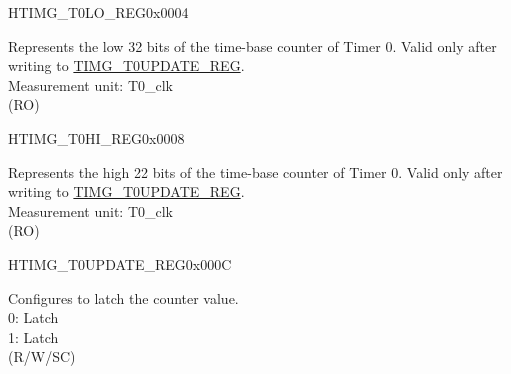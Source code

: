 \begin{register}{H}{TIMG\_T0LO\_REG}{0x0004}\label{regdesc:TIMGTXLOREG}
%
\regnewline%
\begin{regdesc}\begin{reglist}
\label{fielddesc:TIMGTXLO}\item [TIMG\_T0\_LO] Represents the low 32 bits of the time-base counter of Timer 0. Valid only after writing to \hyperref[regdesc:TIMGTXUPDATEREG]{TIMG\_T0UPDATE\_REG}. \\
Measurement unit: T0\_clk \\
(RO)
\end{reglist}\end{regdesc}
\end{register}


\begin{register}{H}{TIMG\_T0HI\_REG}{0x0008}\label{regdesc:TIMGTXHIREG}
%
%
\regnewline%
\begin{regdesc}\begin{reglist}
\label{fielddesc:TIMGTXHI}\item [TIMG\_T0\_HI] Represents the high 22 bits of the time-base counter of Timer 0. Valid only after writing to \hyperref[regdesc:TIMGTXUPDATEREG]{TIMG\_T0UPDATE\_REG}. \\
Measurement unit: T0\_clk \\
(RO)
\end{reglist}\end{regdesc}
\end{register}


\begin{register}{H}{TIMG\_T0UPDATE\_REG}{0x000C}\label{regdesc:TIMGTXUPDATEREG}
%
%
\regnewline%
\begin{regdesc}\begin{reglist}
\label{fielddesc:TIMGTXUPDATE}\item [TIMG\_T0\_UPDATE] Configures to latch the counter value. \\
0: Latch \\
1: Latch \\
(R/W/SC)
\end{reglist}\end{regdesc}
\end{register}


